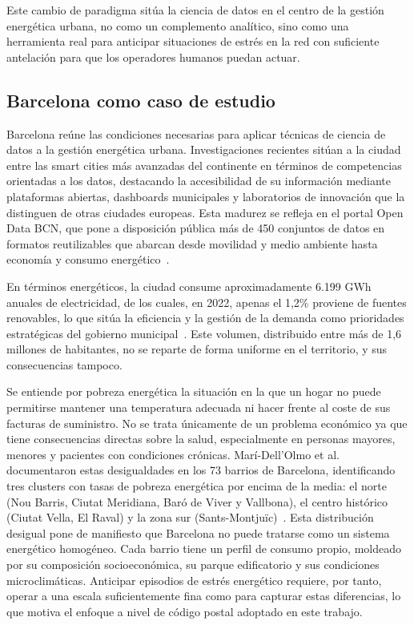 \documentclass[12pt, a4paper]{article}
\begin{document}
Este cambio de paradigma sitúa la ciencia de datos en el centro de la gestión energética urbana, no como un complemento analítico, sino como una herramienta real para anticipar situaciones de estrés en la red con suficiente antelación para que los operadores humanos puedan actuar.

\subsection{Barcelona como caso de estudio}

Barcelona reúne las condiciones necesarias para aplicar técnicas de ciencia de datos a la gestión energética urbana. Investigaciones recientes sitúan a la ciudad entre las smart cities más avanzadas del continente en términos de competencias orientadas a los datos, destacando la accesibilidad de su información mediante plataformas abiertas, dashboards municipales y laboratorios de innovación que la distinguen de otras ciudades europeas. Esta madurez se refleja en el portal Open Data BCN, que pone a disposición pública más de 450 conjuntos de datos en formatos reutilizables que abarcan desde movilidad y medio ambiente hasta economía y consumo energético~\cite{krogstie2020}.

En términos energéticos, la ciudad consume aproximadamente 6.199 GWh anuales de electricidad, de los cuales, en 2022, apenas el 1,2\% proviene de fuentes renovables, lo que sitúa la eficiencia y la gestión de la demanda como prioridades estratégicas del gobierno municipal~\cite{ajuntament2022}. Este volumen, distribuido entre más de 1,6 millones de habitantes, no se reparte de forma uniforme en el territorio, y sus consecuencias tampoco.

Se entiende por pobreza energética la situación en la que un hogar no puede permitirse mantener una temperatura adecuada ni hacer frente al coste de sus facturas de suministro. No se trata únicamente de un problema económico ya que tiene consecuencias directas sobre la salud, especialmente en personas mayores, menores y pacientes con condiciones crónicas. Marí-Dell'Olmo et al. documentaron estas desigualdades en los 73 barrios de Barcelona, identificando tres clusters con tasas de pobreza energética por encima de la media: el norte (Nou Barris, Ciutat Meridiana, Baró de Viver y Vallbona), el centro histórico (Ciutat Vella, El Raval) y la zona sur (Sants-Montjuïc)~\cite{maridelolmo2022}. Esta distribución desigual pone de manifiesto que Barcelona no puede tratarse como un sistema energético homogéneo. Cada barrio tiene un perfil de consumo propio, moldeado por su composición socioeconómica, su parque edificatorio y sus condiciones microclimáticas. Anticipar episodios de estrés energético requiere, por tanto, operar a una escala suficientemente fina como para capturar estas diferencias, lo que motiva el enfoque a nivel de código postal adoptado en este trabajo.
\end{document}
